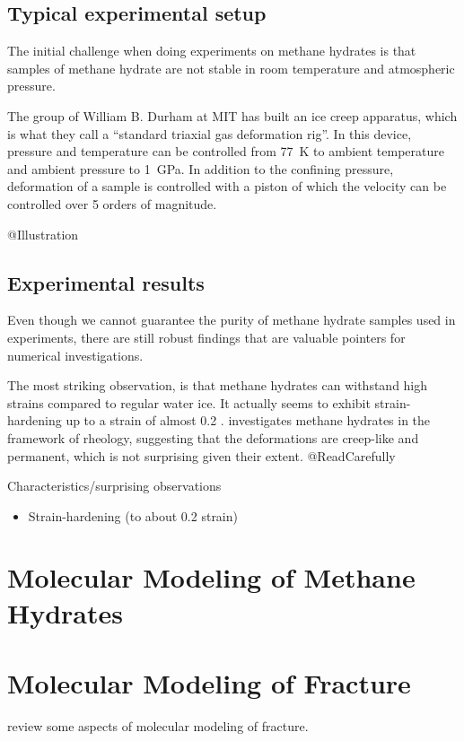 \subsection{Typical experimental setup}
The initial challenge when doing experiments on methane hydrates is that samples of methane hydrate are not stable in room temperature and atmospheric pressure.

The group of William B. Durham at MIT has built an ice creep apparatus, which is what they call a ``standard triaxial gas deformation rig''. In this device, pressure and temperature can be controlled from \SI{77}{\kelvin} to ambient temperature and ambient pressure to \SI{1}{\giga\pascal}. In addition to the confining pressure, deformation of a sample is controlled with a piston of which the velocity can be controlled over 5 orders of magnitude.

@Illustration

\subsection{Experimental results}
Even though we cannot guarantee the purity of methane hydrate samples used in experiments, there are still robust findings that are valuable pointers for numerical investigations. 

The most striking observation, is that methane hydrates can withstand high strains compared to regular water ice. It actually seems to exhibit strain-hardening up to a strain of almost 0.2 \cite{Durham2003, Stern1998}. \cite{Durham2003} investigates methane hydrates in the framework of rheology, suggesting that the deformations are creep-like and permanent, which is not surprising given their extent. @ReadCarefully 

Characteristics/surprising observations
\begin{itemize}
\item Strain-hardening (to about 0.2 strain)
\end{itemize}

\section{Molecular Modeling of Methane Hydrates}

\section{Molecular Modeling of Fracture}
\citet{doi:10.1142/9789812773326_0001} review some aspects of molecular modeling of fracture. 

